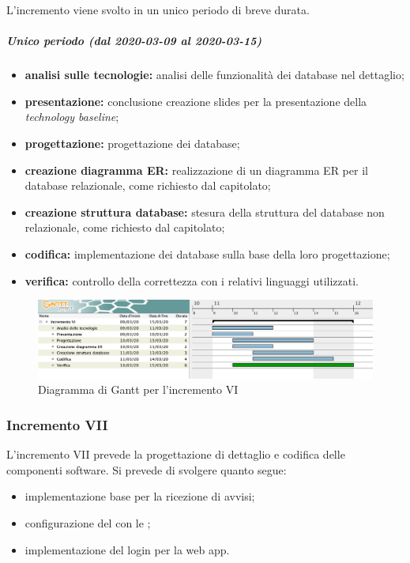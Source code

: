 				L'incremento viene svolto in un unico periodo di breve durata.
				
				\subparagraph{Unico periodo (dal 2020-03-09 al 2020-03-15)}
				
					\begin{itemize}
						\item \textbf{analisi sulle tecnologie:} analisi delle funzionalità dei database nel dettaglio;
						\item \textbf{presentazione:} conclusione creazione slides per la presentazione della \textit{technology baseline};
						\item \textbf{progettazione:} progettazione dei database;
						\item \textbf{creazione diagramma ER:} realizzazione di un diagramma ER per il database relazionale, come richiesto dal capitolato;
						\item \textbf{creazione struttura database:} stesura della struttura del database non relazionale, come richiesto dal capitolato;
						\item \textbf{codifica:} implementazione dei database sulla base della loro progettazione;
						\item \textbf{verifica:} controllo della correttezza con i relativi linguaggi utilizzati.
					\end{itemize} 			

		\begin{landscape}
          \begin{figure}[H]
            \centering
            \includegraphics[width=\linewidth]{images/gantt/incrementoVI} %
            \caption{Diagramma di Gantt per l'incremento VI}
          \end{figure}		
		\end{landscape}


		\subsubsection{Incremento VII}
			
			L'incremento VII prevede la progettazione di dettaglio e codifica delle componenti software. Si prevede di svolgere quanto segue:
			\begin{itemize}
				\item implementazione base  per la ricezione di avvisi;
				\item configurazione del  con le ;
				\item implementazione del login per la web app.
			\end{itemize}
			
